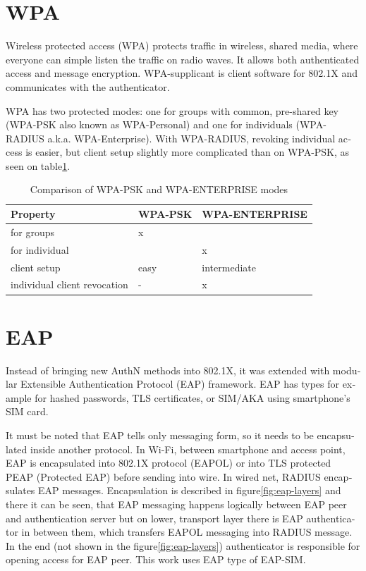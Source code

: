 \documentclass[12pt,a4paper,english]{tutthesis}
\begin{document}
\begin{otherlanguage}{english}
\section{WPA}
\label{sec-2-3}

Wireless protected access (WPA) protects traffic in wireless,
shared media, where everyone can simple listen the traffic on
radio waves. It allows both authenticated access and message
encryption.
WPA-supplicant is client software for 802.1X and communicates with the authenticator.

WPA has two protected modes: one for groups with common, pre-shared
key (WPA-PSK also known as WPA-Personal) and one for individuals
(WPA-RADIUS a.k.a. WPA-Enterprise).  With WPA-RADIUS, revoking
individual access is easier, but client setup slightly more
complicated than on WPA-PSK, as seen on table\ref{psk-enterprise}.

\begin{table}[htb]
\caption{\label{psk-enterprise}Comparison of WPA-PSK and WPA-ENTERPRISE modes}
\centering
\begin{tabular}{lll}
Property & WPA-PSK & WPA-ENTERPRISE\\
\hline
for groups & x & \\
for individual &  & x\\
client setup & easy & intermediate\\
individual client revocation & - & x\\
\hline
\end{tabular}
\end{table}

\section{EAP}
\label{sec-2-4}

Instead of bringing new AuthN methods into 802.1X, it was 
extended with modular Extensible Authentication Protocol (EAP) 
framework\cite{rfc5247}. EAP has types for example for hashed
passwords, TLS certificates, or SIM/AKA using smartphone's SIM card.

It must be noted that EAP tells only messaging form, so it needs
to be encapsulated inside another protocol.  In Wi-Fi, between
smartphone and access point, EAP is encapsulated into 802.1X protocol
(EAPOL) or into TLS protected PEAP (Protected EAP)\cite{peap} before
sending into wire. In wired net, RADIUS encapsulates EAP
messages. Encapsulation is described in figure\ref{fig:eap-layers}
and there it can be seen, that 
EAP messaging happens logically between EAP peer and authentication
server but on lower, transport layer there is EAP authenticator in
between them, which transfers EAPOL messaging into RADIUS message.
In the end (not shown in the figure\ref{fig:eap-layers}) authenticator is
responsible for opening access for EAP peer. This work uses EAP type of EAP-SIM.




\end{otherlanguage}
\end{document}
